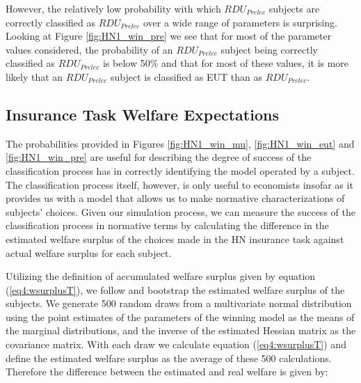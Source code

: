 \documentclass[../main.tex]{subfiles}
\begin{document}
However, the relatively low probability with which $\mathit{RDU_{Prelec}}$ subjects are correctly classified as $\mathit{RDU_{Prelec}}$ over a wide range of parameters is surprising.
Looking at Figure \ref{fig:HN1_win_pre} we see that for most of the parameter values considered, the probability of an $\mathit{RDU_{Prelec}}$ subject being correctly classified as $\mathit{RDU_{Prelec}}$ is below 50\% and that for most of these values, it is more likely that an $\mathit{RDU_{Prelec}}$ subject is classified as EUT than as $\mathit{RDU_{Prelec}}$.

\subsection{\texorpdfstring{\textcite{Harrison2016}}{Harrison and Ng (2016)} Insurance Task Welfare Expectations}
\label{sec4:WT}

The probabilities provided in Figures \ref{fig:HN1_win_mu}, \ref{fig:HN1_win_eut} and \ref{fig:HN1_win_pre} are useful for describing the degree of success of the classification process has in correctly identifying the model operated by a subject.
The classification process itself, however, is only useful to economists insofar as it provides us with a model that allows us to make normative characterizations of subjects' choices.
Given our simulation process, we can measure the success of the classification process in normative terms by calculating the difference in the estimated welfare surplus of the choices made in the HN insurance task against actual welfare surplus for each subject.

Utilizing the definition of accumulated welfare surplus given by equation (\ref{eq4:wsurplusT}), we follow \textcite[110-111]{Harrison2016} and bootstrap the estimated welfare surplus of the subjects.
We generate 500 random draws from a multivariate normal distribution using the point estimates of the parameters of the winning model as the means of the marginal distributions, and the inverse of the estimated Hessian matrix as the covariance matrix.{\footnotemark}
With each draw we calculate equation (\ref{eq4:wsurplusT}) and define the estimated welfare surplus as the average of these 500 calculations.
Therefore the difference between the estimated and real welfare is given by:

\addtocounter{footnote}{-1}
\end{document}

